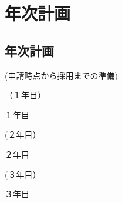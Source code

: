 \section{年次計画}

\subsection{年次計画}
\vspace*{20pt}
	\noindent
	(申請時点から採用までの準備)
	
{%
}%
	
    	\noindent
    	（１年目）
	
{%
		１年目
}%

	\vspace{5mm}
	\noindent
	(２年目）
	
{%
		２年目
}%

	\vspace{5mm}
	\noindent
	(３年目）
	
{%
		３年目
}%




